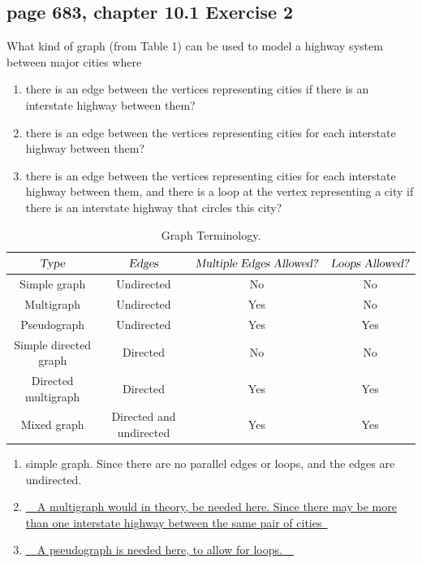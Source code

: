 \documentclass[sigconf]{acmart}
\begin{document}
\subsection{page 683, chapter 10.1 Exercise 2}
\begin{shaded}
    What kind of graph (from Table 1) can be used to model a highway system between major cities where
    \begin{enumerate}[label=(\alph*)]
        \item there is an edge between the vertices representing cities if there is an interstate highway between them?
        \item there is an edge between the vertices representing cities for each interstate highway between them?
        \item there is an edge between the vertices representing cities for each interstate highway between them, and there is a loop at the vertex representing a city if there is an interstate highway that circles this city?
    \end{enumerate}
\end{shaded}
\begin{table}[h]
    \centering
	\caption{Graph Terminology.}
    \begin{tabular}{c|c|c|c}
        \hline
        $\textsl{Type}$ & $\textsl{Edges}$ & $\textsl{Multiple Edges Allowed?}$ & $\textsl{Loops Allowed?}$ \\ 
        \hline
        Simple graph & Undirected & No & No \\ 
        Multigraph & Undirected & Yes & No \\ 
        Pseudograph & Undirected & Yes & Yes \\ 
        Simple directed graph & Directed & No & No \\ 
        Directed multigraph & Directed & Yes & Yes \\ 
        Mixed graph & Directed and undirected & Yes & Yes \\ 
    	\hline
	\end{tabular}
\end{table}
\begin{enumerate}[label=(\alph*)]
    \item simple graph. Since there are no parallel edges or loops, and the edges are undirected. 
    \item \uline{~~A multigraph would in theory, be needed here. Since there may be more than one interstate highway between the same pair of cities~}
    \item \uline{~~A pseudograph is needed here, to allow for loops.~~}
\end{enumerate}
\end{document}
